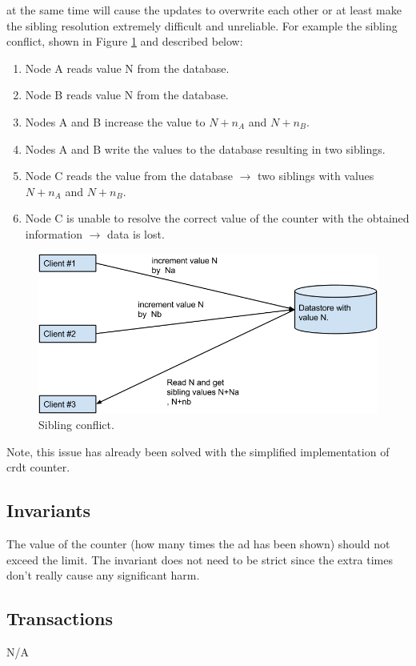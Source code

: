 \documentclass[11pt,a4paper]{report}
\begin{document}
at the same time will cause the updates to overwrite each other or at least make the sibling resolution extremely difficult and unreliable.
For example the sibling conflict, shown in Figure \ref{fig:sibling_conflict}  and described below:
\begin{enumerate}
\item Node A reads value N from the database.
\item Node B reads value N from the database. 
\item Nodes A and B increase the value to $N+n_A$ and $N+n_B$. 
\item Nodes A and B write the values to the database resulting in two siblings. 
\item Node C reads the value from the database $\rightarrow$ two siblings with values $N+n_A$ and $N+n_B$. 
\item Node C is unable to resolve the correct value of the counter with the obtained information $\rightarrow$ data is lost.
\end{enumerate}
\begin{figure}[!h]
	\centering
	\includegraphics[width=1\textwidth]{./img/Sibling_conflict.png}
	
	\caption{Sibling conflict.}
	\label{fig:sibling_conflict}
\end{figure}

Note, this issue has already been solved with the simplified implementation of \gls{crdt} counter.

\subsection{Invariants}
The value of the counter (how many times the ad has been shown) should not exceed the limit. 
The invariant does not need to be strict since the extra times don't really cause any significant harm.

\subsection{Transactions}
N/A
\end{document}
